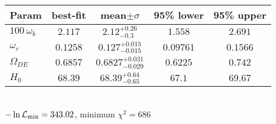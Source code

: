 \begin{tabular}{|l|c|c|c|c|} 
 \hline 
Param & best-fit & mean$\pm\sigma$ & 95\% lower & 95\% upper \\ \hline 
$100~\omega_{b }$ &$2.117$ & $2.12_{-0.3}^{+0.26}$ & $1.558$ & $2.691$ \\ 
$\omega_c$ &$0.1258$ & $0.127_{-0.015}^{+0.015}$ & $0.09761$ & $0.1566$ \\ 
$\Omega_{DE}$ &$0.6857$ & $0.6827_{-0.029}^{+0.031}$ & $0.6225$ & $0.742$ \\ 
$H_{0 }$ &$68.39$ & $68.39_{-0.65}^{+0.64}$ & $67.1$ & $69.67$ \\ 
\hline 
 \end{tabular} \\ 
$-\ln{\cal L}_\mathrm{min} =343.02$, minimum $\chi^2=686$ \\ 
